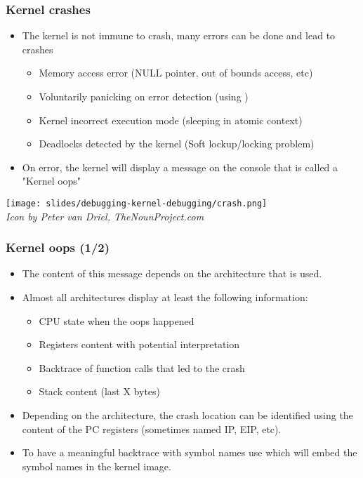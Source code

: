 \begin{frame}
  \frametitle{Kernel crashes}
  \begin{itemize}
    \item The kernel is not immune to crash, many errors can be done and lead to
          crashes
    \begin{itemize}
      \item Memory access error (NULL pointer, out of bounds access, etc)
      \item Voluntarily panicking on error detection (using )
      \item Kernel incorrect execution mode (sleeping in atomic context)
      \item Deadlocks detected by the kernel (Soft lockup/locking problem)
    \end{itemize}
    \item On error, the kernel will display a message on the console that
          is called a "Kernel oops"
  \end{itemize}
  \begin{center}
    \center\texttt{[image: slides/debugging-kernel-debugging/crash.png]}\\
    {\tiny {\em Icon by Peter van Driel, TheNounProject.com}}
  \end{center}
\end{frame}

\begin{frame}
  \frametitle{Kernel oops (1/2)}
  \begin{itemize}
    \item The content of this message depends on the architecture that is used.
    \item Almost all architectures display at least the following information:
    \begin{itemize}
      \item CPU state when the oops happened
      \item Registers content with potential interpretation
      \item Backtrace of function calls that led to the crash
      \item Stack content (last X bytes)
    \end{itemize}
    \item Depending on the architecture, the crash location can be identified
          using the content of the PC registers (sometimes named IP, EIP, etc).
    \item To have a meaningful backtrace with symbol names use
           which will embed the
          symbol names in the kernel image.
  \end{itemize}
\end{frame}

